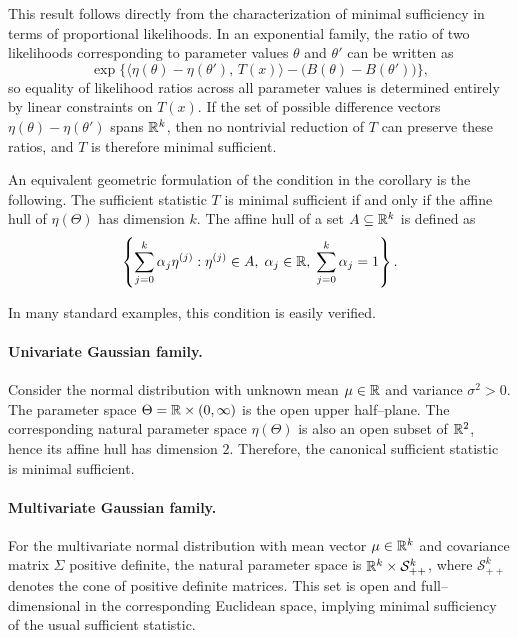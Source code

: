This result follows directly from the characterization of minimal sufficiency in terms of
proportional likelihoods. In an exponential family, the ratio of two likelihoods corresponding
to parameter values \(\theta\) and \(\theta'\) can be written as
\[
    \exp\Big\{
        \big\langle \eta(\theta) - \eta(\theta'),\, T(x) \big\rangle
        - \big(B(\theta) - B(\theta')\big)
    \Big\},
\]
so equality of likelihood ratios across all parameter values is determined entirely by linear
constraints on \(T(x)\). If the set of possible difference vectors
\(\eta(\theta) - \eta(\theta')\) spans \(\mathbb{R}^k\), then no nontrivial reduction of \(T\) can preserve
these ratios, and \(T\) is therefore minimal sufficient.

An equivalent geometric formulation of the condition in the corollary is the following.
The sufficient statistic \(T\) is minimal sufficient if and only if the affine hull of
\(\eta(\Theta)\) has dimension \(k\).
The affine hull of a set \(A \subseteq \mathbb{R}^k\) is defined as
\[
    \left\{
        \sum\limits_{j=0}^{k} \alpha_j \eta^{(j)} :
        \eta^{(j)} \in A,\;
        \alpha_j \in \mathbb{R},\;
        \sum\limits_{j=0}^{k} \alpha_j = 1
    \right\}.
\]

In many standard examples, this condition is easily verified.

\paragraph{Univariate Gaussian family.}
Consider the normal distribution with unknown mean \(\mu \in \mathbb{R}\) and variance
\(\sigma^2 > 0\).
The parameter space \(\Theta = \mathbb{R} \times (0,\infty)\) is the open upper half--plane.
The corresponding natural parameter space \(\eta(\Theta)\) is also an open subset of
\(\mathbb{R}^2\), hence its affine hull has dimension \(2\).
Therefore, the canonical sufficient statistic is minimal sufficient.

\paragraph{Multivariate Gaussian family.}
For the multivariate normal distribution with mean vector \(\mu \in \mathbb{R}^k\) and covariance
matrix \(\Sigma\) positive definite, the natural parameter space is
\(\mathbb{R}^k \times \mathcal{S}_{++}^k\), where \(\mathcal{S}_{++}^k\) denotes the cone of positive
definite matrices.
This set is open and full--dimensional in the corresponding Euclidean space, implying minimal
sufficiency of the usual sufficient statistic.

